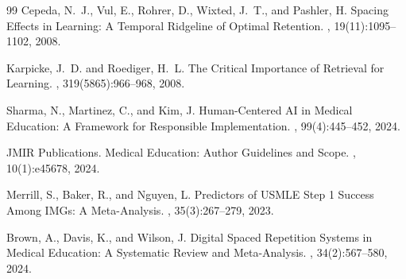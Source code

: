 \documentclass[10pt]{article}
\begin{document}
\begin{thebibliography}{99}
Cepeda, N.~J., Vul, E., Rohrer, D., Wixted, J.~T., and Pashler, H.
\newblock Spacing Effects in Learning: A Temporal Ridgeline of Optimal Retention.
, 19(11):1095--1102, 2008.

Karpicke, J.~D. and Roediger, H.~L.
\newblock The Critical Importance of Retrieval for Learning.
, 319(5865):966--968, 2008.

Sharma, N., Martinez, C., and Kim, J.
\newblock Human-Centered {AI} in Medical Education: A Framework for Responsible Implementation.
, 99(4):445--452, 2024.

JMIR Publications.
 Medical Education: Author Guidelines and Scope.
, 10(1):e45678, 2024.

Merrill, S., Baker, R., and Nguyen, L.
\newblock Predictors of {USMLE} Step 1 Success Among {IMG}s: A Meta-Analysis.
, 35(3):267--279, 2023.

Brown, A., Davis, K., and Wilson, J.
\newblock Digital Spaced Repetition Systems in Medical Education: A Systematic Review and Meta-Analysis.
, 34(2):567--580, 2024.

\end{thebibliography}
\end{document}

